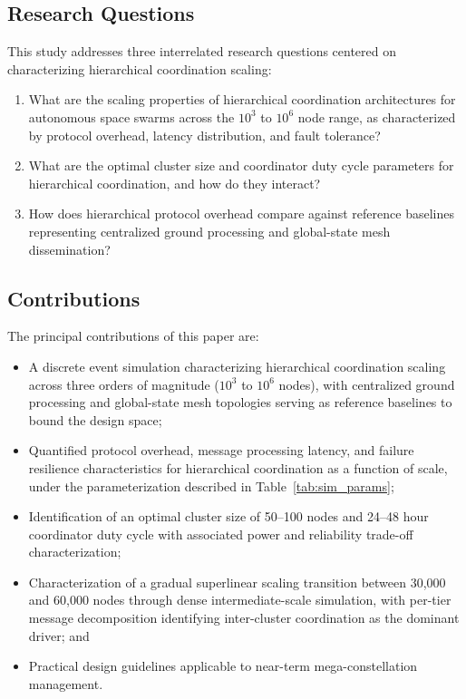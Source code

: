 \documentclass[journal]{IEEEtran}
\begin{document}
\subsection{Research Questions}

This study addresses three interrelated research questions centered on characterizing hierarchical coordination scaling:

\begin{enumerate}
    \item[\textbf{RQ1:}] What are the scaling properties of hierarchical coordination architectures for autonomous space swarms across the $10^3$ to $10^6$ node range, as characterized by protocol overhead, latency distribution, and fault tolerance?
    \item[\textbf{RQ2:}] What are the optimal cluster size and coordinator duty cycle parameters for hierarchical coordination, and how do they interact?
    \item[\textbf{RQ3:}] How does hierarchical protocol overhead compare against reference baselines representing centralized ground processing and global-state mesh dissemination?
\end{enumerate}

\subsection{Contributions}

The principal contributions of this paper are:
\begin{itemize}
    \item A discrete event simulation characterizing hierarchical coordination scaling across three orders of magnitude ($10^3$ to $10^6$ nodes), with centralized ground processing and global-state mesh topologies serving as reference baselines to bound the design space;
    \item Quantified protocol overhead, message processing latency, and failure resilience characteristics for hierarchical coordination as a function of scale, under the parameterization described in Table~\ref{tab:sim_params};
    \item Identification of an optimal cluster size of 50--100 nodes and 24--48 hour coordinator duty cycle with associated power and reliability trade-off characterization;
    \item Characterization of a gradual superlinear scaling transition between 30{,}000 and 60{,}000 nodes through dense intermediate-scale simulation, with per-tier message decomposition identifying inter-cluster coordination as the dominant driver; and
    \item Practical design guidelines applicable to near-term mega-constellation management.
\end{itemize}
\end{document}
